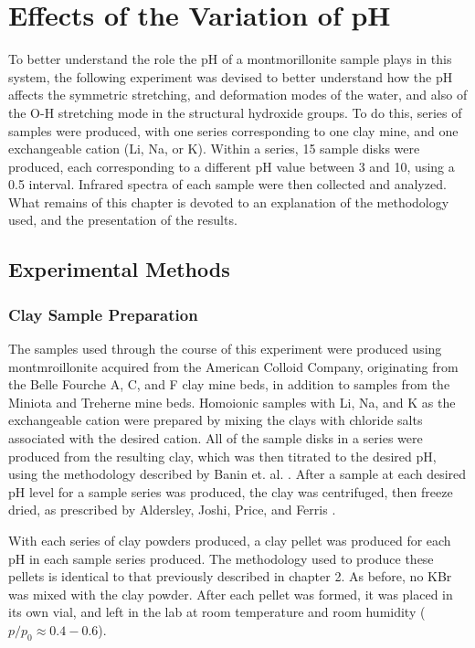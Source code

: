 \section{Effects of the Variation of pH}
To better understand the role the pH of a montmorillonite sample plays in this system, the following experiment was devised to better understand how the pH affects the symmetric stretching, and deformation modes of the water, and also of the O-H stretching mode in the structural hydroxide groups. To do this, series of samples were produced, with one series corresponding to one clay mine, and one exchangeable cation (Li, Na, or K). Within a series, 15 sample disks were produced, each corresponding to a different pH value between 3 and 10, using a 0.5 interval. Infrared spectra of each sample were then collected and analyzed. What remains of this chapter is devoted to an explanation of the methodology used, and the presentation of the results.

\subsection{Experimental Methods}
\subsubsection{Clay Sample Preparation}
The samples used through the course of this experiment were produced using montmroillonite acquired from the American Colloid Company, originating from the Belle Fourche A, C, and F clay mine beds, in addition to samples from the Miniota and Treherne mine beds. Homoionic samples with Li, Na, and K as the exchangeable cation were prepared by mixing the clays with chloride salts associated with the desired cation. All of the sample disks in a series were produced from the resulting clay, which was then titrated to the desired pH, using the methodology described by Banin et. al. \cite{banin1985ph}. After a sample at each desired pH level for a sample series was produced, the clay was centrifuged, then freeze dried, as prescribed by Aldersley, Joshi, Price, and Ferris \cite{aldersley2011role}.

With each series of clay powders produced, a clay pellet was produced for each pH in each sample series produced. The methodology used to produce these pellets is identical to that previously described in chapter 2. As before, no KBr was mixed with the clay powder. After each pellet was formed, it was placed in its own vial, and left in the lab at room temperature and room humidity ($p/p_0\approx 0.4 - 0.6$).

